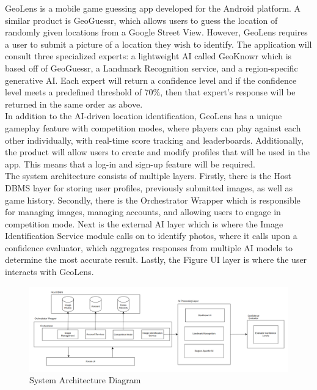 \documentclass[]{article}
\begin{document}
\noindent GeoLens is a mobile game guessing app developed for the Android platform. A similar product is GeoGuessr, which allows users to guess the location of randomly given locations from a Google Street View. However, GeoLens requires a user to submit a picture of a location they wish to identify. The application will consult three specialized experts: a lightweight AI called GeoKnowr which is based off of GeoGuessr, a Landmark Recognition service, and a region-specific generative AI. Each expert will return a confidence level and if the confidence level meets a predefined threshold of 70\%, then that expert's response will be returned in the same order as above.\\

\noindent In addition to the AI-driven location identification, GeoLens has a unique gameplay feature with competition modes, where players can play against each other individually, with real-time score tracking and leaderboards. Additionally, the product will allow users to create and modify profiles that will be used in the app. This means that a log-in and sign-up feature will be required.\\

\noindent The system architecture consists of multiple layers. Firstly, there is the Host DBMS layer for storing user profiles, previously submitted images, as well as game history. Secondly, there is the Orchestrator Wrapper which is responsible for managing images, managing accounts, and allowing users to engage in competition mode. Next is the external AI layer which is where the Image Identification Service module calls on to identify photos, where it calls upon a confidence evaluator, which aggregates responses from multiple AI models to determine the most accurate result. Lastly, the Figure UI layer is where the user interacts with GeoLens.\\

\begin{figure}[h]
    \centering
    \includegraphics[width=1\linewidth]{system_diagram.png}
    \caption{System Architecture Diagram}
    \label{fig:system_diagram}
\end{figure}
\end{document}
